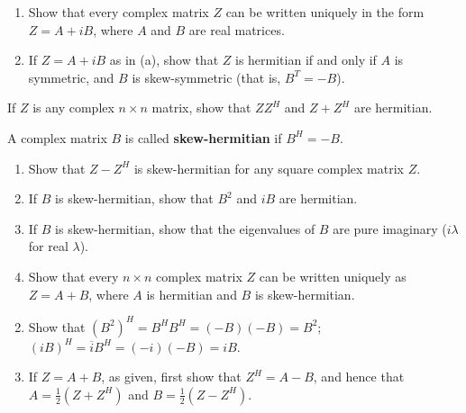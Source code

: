 \begin{multicols}{2}
\begin{ex}
\begin{enumerate}[label={\alph*.}]
\item Show that every complex matrix $Z$ can be written uniquely in the form $Z = A + iB$, where $A$ and $B$ are real matrices.

\item If $Z = A + iB$ as in (a), show that $Z$ is hermitian if and only if $A$ is symmetric, and $B$ is skew-symmetric (that is, $B^{T} = -B$).

\end{enumerate}
\end{ex}

\begin{ex}
If $Z$ is any complex $n \times n$ matrix, show that $ZZ^{H}$ and $Z + Z^{H}$ are hermitian.
\end{ex}

\begin{ex}
A complex matrix $B$ is called \textbf{skew-hermitian} if $B^{H} = -B$.


\begin{enumerate}[label={\alph*.}]
\item Show that $Z - Z^{H}$ is skew-hermitian for any square complex matrix $Z$.

\item If $B$ is skew-hermitian, show that $B^{2}$ and $iB$ are hermitian.

\item If $B$ is skew-hermitian, show that the eigenvalues of $B$ are pure imaginary ($i \lambda$ for real $\lambda$).

\item Show that every $n \times n$ complex matrix $Z$ can be written uniquely as $Z = A + B$, where $A$ is hermitian and $B$ is skew-hermitian.

\end{enumerate}
\begin{sol}
\begin{enumerate}[label={\alph*.}]
\setcounter{enumi}{1}
\item  Show that $(B^2)^H = B^HB^H = (-B)(-B) = B^2$; $(iB)^H = \overline{i}B^H = (-i)(-B) = iB$.


\setcounter{enumi}{3}
\item  If $Z = A + B$, as given, first show that $Z^{H} = A - B$, and hence that $A = \frac{1}{2}(Z + Z^{H})$ and $B = \frac{1}{2}(Z - Z^{H})$.


\end{enumerate}
\end{sol}
\end{ex}
\end{multicols}
